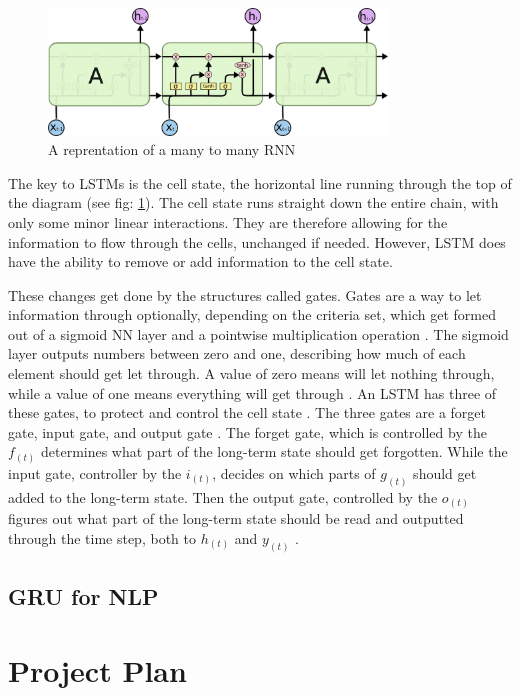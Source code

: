 \documentclass[a4paper,10pt]{article}
\begin{document}
	\begin{figure}
		\begin{center}
			\includegraphics[width=9cm]{LSTM3-chain.png}
			\caption{A reprentation of a many to many RNN \cite{lstm_networks}}
			\label{fig:LSTM_diagram}
		\end{center}
	\end{figure} 
	
	The key to LSTMs is the cell state, the horizontal line running through the top of the diagram (see fig: \ref{fig:LSTM_diagram}). The cell state runs straight down the entire chain, with only some minor linear interactions. They are therefore allowing for the information to flow through the cells, unchanged if needed. However, LSTM does have the ability to remove or add information to the cell state. 
	
	These changes get done by the structures called gates. Gates are a way to let information through optionally, depending on the criteria set, which get formed out of a sigmoid NN layer and a pointwise multiplication operation \cite{lstm_networks}. The sigmoid layer outputs numbers between zero and one, describing how much of each element should get let through. A value of zero means will let nothing through, while a value of one means everything will get through \cite{lstm_networks, geron2019hands}. An LSTM has three of these gates, to protect and control the cell state \cite{lstm_networks}. The three gates are a forget gate, input gate, and output gate \cite{illustrated_lstm_gru, geron2019hands}. The forget gate, which is controlled by the $f_{(t)}$ determines what part of the long-term state should get forgotten. While the input gate, controller by the $i_{(t)}$, decides on which parts of $g_{(t)}$ should get added to the long-term state. Then the output gate, controlled by the $o_{(t)}$ figures out what part of the long-term state should be read and outputted through the time step, both to $h_{(t)}$ and $y_{(t)}$ \cite{geron2019hands}.
	
\subsection{GRU for NLP}


\section{Project Plan}
\label{sec:project_plan}


\medskip
\newpage
	
	




\end{document}
